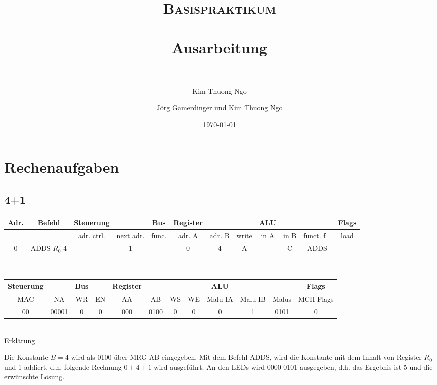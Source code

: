 \documentclass[paper=a4, fontsize=11pt]{scrartcl}
\author{Kim Thuong Ngo}
\title{	
\normalfont \normalsize 
\textsc{Basispraktikum} \\ [25pt] 
\horrule{0.5pt} \\[0.4cm] 
\huge Ausarbeitung \\ 
\horrule{2pt} \\[0.5cm] 
}
\author{Jörg Gamerdinger und Kim Thuong Ngo}
\date{\normalsize\today}
\numberwithin{equation}{section}
\numberwithin{figure}{section}
\numberwithin{table}{section}
\begin{document}
\maketitle 

\newpage

\tableofcontents

\newpage


\section{Rechenaufgaben}


\subsection{4+1}

\begin{tabular}{|c|c|cc|c|ccc|ccc|c|}
\hline
Adr. & Befehl &Steuerung & & Bus & Register & & & ALU & & & Flags \\
\hline
& & adr. ctrl. & next adr. & func. & adr. A & adr. B & write & in A & in B & funct. f= & load \\
\hline
0 & ADDS $R_{0}$ 4 & -  & 1 & - & 0 & 4 & A & - & C & ADDS & - \\
\hline
\end{tabular} \\

\begin{tabular}{|cc|cc|cccc|ccc|c|}
\hline
Steuerung & & Bus & & Register & & & & ALU & & & Flags \\
\hline
MAC & NA & WR & EN & AA & AB & WS & WE & Malu IA & Malu IB & Malus & MCH Flags \\
\hline
00 & 00001 & 0 & 0 & 000 & 0100 & 0 & 0 & 0 & 1 & 0101 & 0 \\
\hline
\end{tabular} \\

\underline{Erklärung}

Die Konstante $B=4$ wird als 0100 über MRG AB eingegeben. Mit dem Befehl ADDS, wird die Konstante mit dem Inhalt von Register $R_{0}$ und 1 addiert, d.h. folgende Rechnung $0+4+1$ wird ausgeführt. An den LEDs wird 0000 0101 ausgegeben, d.h. das Ergebnis ist 5 und die erwünschte Lösung.
\end{document}
